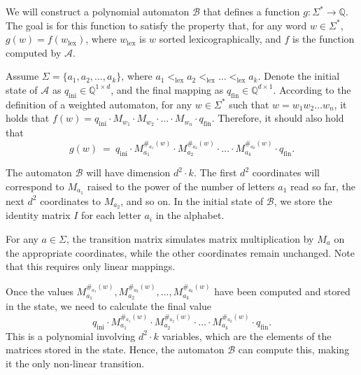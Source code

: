 \documentclass[12pt]{article}
\begin{document}
	\medskip
	
	We will construct a polynomial automaton \(\mathcal{B}\) that defines a
	function \(g : \Sigma^{\ast} \to \mathbb{Q}\). The goal is for this function
	to satisfy the property that, for any word \(w \in \Sigma^{\ast}\), \(g(w) =
	f(w_{\text{lex}})\), where \(w_{\text{lex}}\) is \(w\) sorted
	lexicographically, and \(f\) is the function computed by \(\mathcal{A}\).
	
	\medskip
	
	Assume \(\Sigma = \{a_{1}, a_{2}, \ldots, a_{k}\}\), where \(a_{1}
	<_{\text{lex}} a_{2} <_{\text{lex}} \ldots <_{\text{lex}} a_{k}\). Denote
	the initial state of \(\mathcal{A}\) as \(q_{\text{ini}} \in
	\mathbb{Q}^{1 \times d}\), and the final mapping as \(q_{\text{fin}} \in
	\mathbb{Q}^{d \times 1}\). According to the definition of a weighted
	automaton, for any \(w \in \Sigma^{\ast}\) such that \(w = w_{1} w_{2}
	\ldots w_{n}\), it holds that \(f(w) = q_{\text{ini}} \cdot M_{w_{1}} \cdot
	M_{w_{2}} \cdot \ldots \cdot M_{w_{n}} \cdot q_{\text{fin}}\). Therefore, it
	should also hold that
	\[ g(w) \ = \ q_{\text{ini}} \cdot M_{a_{1}}^{\#_{a_{1}}(w)} \cdot
	M_{a_{2}}^{\#_{a_{2}}(w)} \cdot \ldots \cdot M_{a_{k}}^{\#_{a_{k}}(w)} \cdot
	q_{\text{fin}} \text{.} \]
	
	\medskip
	
	The automaton \(\mathcal{B}\) will have dimension \(d^{2} \cdot k\). The
	first \(d^{2}\) coordinates will correspond to \(M_{a_{1}}\) raised to the
	power of the number of letters \(a_{1}\) read so far, the next \(d^{2}\)
	coordinates to \(M_{a_{2}}\), and so on. In the initial state of
	\(\mathcal{B}\), we store the identity matrix \(I\) for each letter
	\(a_{i}\) in the alphabet.
	
	\medskip
	
	For any \(a \in \Sigma\), the transition matrix simulates matrix
	multiplication by \(M_{a}\) on the appropriate coordinates, while the other
	coordinates remain unchanged. Note that this requires only linear mappings.
	
	\medskip
	
	Once the values \(M_{a_{1}}^{\#_{a_{1}}(w)}, M_{a_{2}}^{\#_{a_{2}}(w)},
	\ldots, M_{a_{k}}^{\#_{a_{k}}(w)}\) have been computed and stored in the
	state, we need to calculate the final value
	\[ q_{\text{ini}} \cdot M_{a_{1}}^{\#_{a_{1}}(w)} \cdot
	M_{a_{2}}^{\#_{a_{2}}(w)} \cdot \ldots \cdot M_{a_{k}}^{\#_{a_{k}}(w)} \cdot
	q_{\text{fin}} \text{.} \]
	This is a polynomial involving \(d^{2} \cdot k\) variables, which are the
	elements of the matrices stored in the state. Hence, the automaton
	\(\mathcal{B}\) can compute this, making it the only non-linear transition.
	
\end{document}
